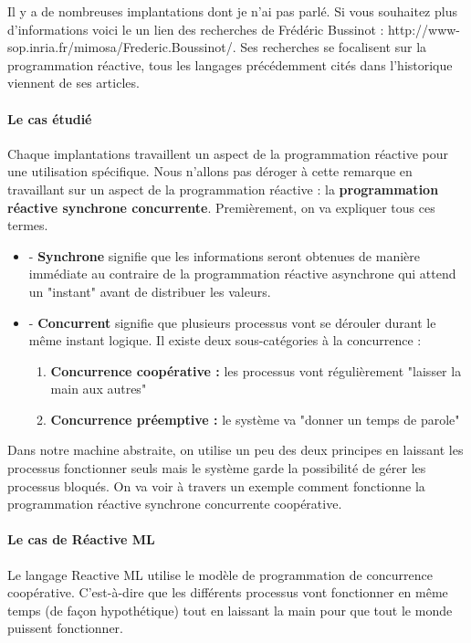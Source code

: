 \documentclass[10pt,a4paper]{report}
\begin{document}
	
	Il y a de nombreuses implantations dont je n'ai pas parlé. Si vous souhaitez plus d'informations voici le un lien des recherches de Frédéric Bussinot : http://www-sop.inria.fr/mimosa/Frederic.Boussinot/. Ses recherches se focalisent sur la programmation réactive, tous les langages précédemment cités dans l'historique viennent de ses articles.
	\bigbreak


  	\paragraph{Le cas étudié} Chaque implantations travaillent un aspect de la programmation réactive pour une utilisation spécifique. Nous n'allons pas déroger à cette remarque en travaillant sur un aspect de la programmation réactive : la \textbf{programmation réactive synchrone concurrente}. Premièrement, on va expliquer tous ces termes.
	\begin{itemize}
		\item[] - \textbf{Synchrone} signifie que les informations seront obtenues de manière immédiate au contraire de la programmation réactive asynchrone qui attend un "instant" avant de distribuer les valeurs. 
		\item[] - \textbf{Concurrent} signifie que plusieurs processus vont se dérouler durant le même instant logique. Il existe deux sous-catégories à la concurrence :
		\begin{enumerate}
			\item \textbf{Concurrence coopérative :} les processus vont régulièrement "laisser la main aux autres"
			\item \textbf{Concurrence préemptive :} le système va "donner un temps de parole"
		\end{enumerate}
	\end{itemize}
	\medbreak
	
	Dans notre machine abstraite, on utilise un peu des deux principes en laissant les processus fonctionner seuls mais le système garde la possibilité de gérer les processus bloqués. On va voir à travers un exemple comment fonctionne la programmation réactive synchrone concurrente coopérative.
	\newpage
	
	
	
	\paragraph{Le cas de Réactive ML}
	Le langage Reactive ML utilise le modèle de programmation de concurrence coopérative. C'est-à-dire que les différents processus vont fonctionner en même temps (de façon hypothétique) tout en laissant la main pour que tout le monde puissent fonctionner. 
	\medbreak
	
\end{document}
